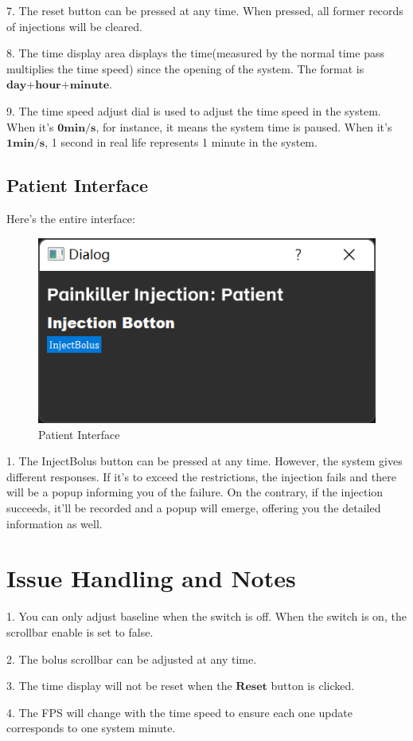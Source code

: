 \documentclass{article}
\begin{document}
7. The reset button can be pressed at any time. When pressed, all former records of injections will be cleared.

8. The time display area displays the time(measured by the normal time pass multiplies the time speed) since the opening of the system. The format is $\textbf{day+hour+minute}$.

9. The time speed adjust dial is used to adjust the time speed in the system. When it's $\textbf{0min/s}$, for instance, it means the system time is paused. When it's $\textbf{1min/s}$, 1 second in real life represents 1 minute in the system.
\subsection{Patient Interface}
Here's the entire interface:
\begin{figure}[htbp]
  \centering
  \includegraphics{img/patient_ui.png}
  \caption{Patient Interface}
\end{figure}

1. The InjectBolus button can be pressed at any time. However, the system gives different responses. If it's to exceed the restrictions, the injection fails and there will be a popup informing you of the failure. On the contrary, if the injection succeeds, it'll be recorded and a popup will emerge, offering you the detailed information as well.
\section{Issue Handling and Notes}
1. You can only adjust baseline when the switch is off. When the switch is on, the scrollbar enable is set to false.

2. The bolus scrollbar can be adjusted at any time.

3. The time display will not be reset when the $\textbf{Reset}$ button is clicked.

4. The FPS will change with the time speed to ensure each one update corresponds to one system minute.
\end{document}
